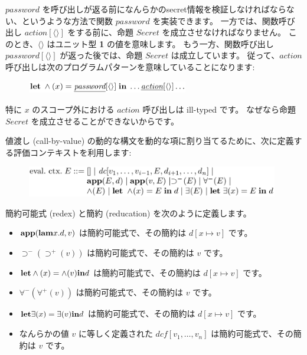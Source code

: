 \documentclass[submit,techreq,noauthor,onecolumn]{ipsj}
\begin{document}
\noindent \underline{$password$} を呼び出しが返る前になんらかのsecret情報を検証しなければならない、というような方法で関数 \underline{$password$} を実装できます。
一方では、関数呼び出し \underline{$action$}$[\langle\rangle]$ をする前に、命題 \underline{$Secret$} を成立させなければなりません。
このとき、$\langle\rangle$ はユニット型 {\bf 1} の値を意味します。
もう一方、関数呼び出し \underline{$password$}$[\langle\rangle]$ が返った後では、命題 \underline{$Secret$} は成立しています。
従って、\underline{$action$} 呼び出しは次のプログラムパターンを意味していることになります:

\begin{figure}[h]
\centering
\includegraphics[width=7cm]{img/infig22_letin.png}
\end{figure}

\noindent 特に $x$ のスコープ外における \underline{$action$} 呼び出しは ill-typed です。
なぜなら命題 \underline{$Secret$} を成立させることができないからです。

値渡し (call-by-value) の動的な構文を動的な項に割り当てるために、次に定義する評価コンテキストを利用します:

\begin{figure}[h]
\centering
\includegraphics[width=11cm]{img/infig22_eval.png}
\end{figure}

簡約可能式 (redex) と簡約 (reducation) を次のように定義します。

\begin{itemize}
  \item ${\bf app}({\bf lam} x.d, v)$ は簡約可能式で、その簡約は $d[x \mapsto v]$ です。
  \item $\supset^- (\supset^+ (v))$ は簡約可能式で、その簡約は $v$ です。
  \item ${\bf let} \wedge (x) = \wedge (v) {\bf in} d$ は簡約可能式で、その簡約は $d[x \mapsto v]$ です。
  \item $\forall^- (\forall^+ (v))$ は簡約可能式で、その簡約は $v$ です。
  \item ${\bf let} \exists (x) = \exists (v) {\bf in} d$ は簡約可能式で、その簡約は $d[x \mapsto v]$ です。
  \item なんらかの値 $v$ に等しく定義された $dcf[v_1,\ldots,v_n]$ は簡約可能式で、その簡約は $v$ です。
\end{itemize}
\end{document}
